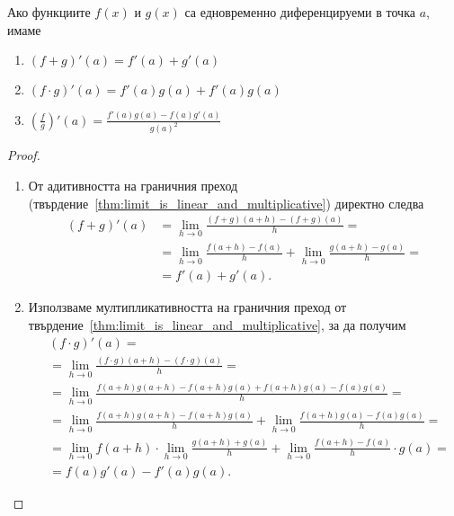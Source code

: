 \documentclass[numbers=endperiod, bibliography=totocnumbered]{scrartcl}
\begin{document}
\begin{theorem}
  Ако функциите \( f(x) \) и \( g(x) \) са едновременно диференцируеми в точка \( a \), имаме
  \begin{enumerate}
    \item \( (f+g)'(a) = f'(a) + g'(a) \)
    \item \( (f \cdot g)'(a) = f'(a) g(a) + f'(a) g(a) \)
    \item \( (\frac f g)'(a) = \frac{f'(a) g(a) - f(a) g'(a)} {{g(a)}^2} \)
  \end{enumerate}
\end{theorem}
\begin{proof}
  \mbox{}
  \begin{enumerate}
    \item От адитивността на граничния преход (твърдение~\ref{thm:limit_is_linear_and_multiplicative}) директно следва
    \begin{align*}
      (f+g)'(a)
      &=
      \lim_{h \to 0} \frac {(f+g)(a+h) - (f+g)(a)} h
      = \\ &=
      \lim_{h \to 0} \frac {f(a+h)-f(a)} h + \lim_{h \to 0} \frac{g(a+h) - g(a)} h
      = \\ &=
      f'(a) + g'(a).
    \end{align*}

    \item Използваме мултипликативността на граничния преход от твърдение~\ref{thm:limit_is_linear_and_multiplicative}, за да получим
    \begin{align*}
      &(f \cdot g)'(a)
      = \\ &=
      \lim_{h \to 0} \frac {(f \cdot g)(a+h) - (f \cdot g)(a)} h
      = \\ &=
      \lim_{h \to 0} \frac {f(a+h) g(a+h) - f(a+h) g(a) + f(a+h) g(a) - f(a) g(a)} h
      = \\ &=
      \lim_{h \to 0} \frac {f(a+h) g(a+h) - f(a+h) g(a)} h + \lim_{h \to 0} \frac {f(a+h) g(a) - f(a) g(a)} h
      = \\ &=
      \lim_{h \to 0} f(a+h) \cdot \lim_{h \to 0} \frac {g(a+h) + g(a)} h + \lim_{h \to 0} \frac {f(a+h) - f(a)} h \cdot g(a)
      = \\ &=
      f(a) g'(a) - f'(a) g(a).
    \end{align*}


\end{enumerate}
\end{proof}
\end{document}
